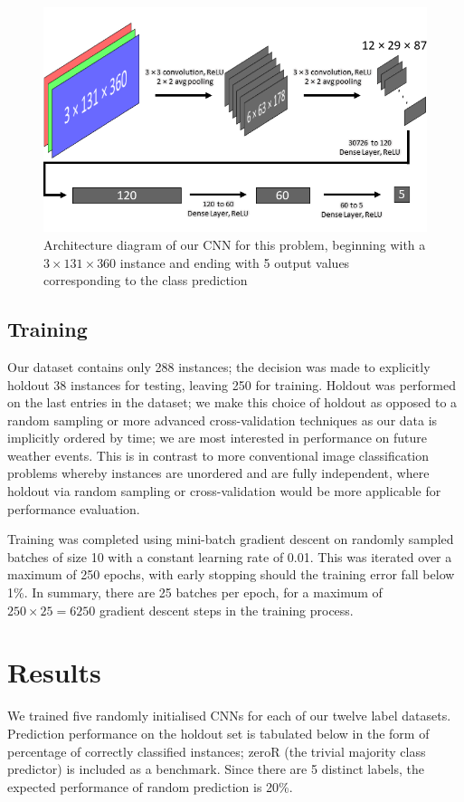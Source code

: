 \documentclass[11pt,a4paper, titlepage]{article}
\begin{document}
\begin{figure}[h]
	\begin{center}
	\includegraphics[width=1.0\textwidth]{images/cnnDiag.png}
	\caption{Architecture diagram of our CNN for this problem, beginning with a $3 \times 131 \times 360$ instance and ending with 5 output values corresponding to the class prediction}
	\end{center}
\end{figure}

\subsection{Training}
Our dataset contains only 288 instances; the decision was made to explicitly holdout 38 instances for testing, leaving 250 for training. Holdout was performed on the last entries in the dataset; we make this choice of holdout as opposed to a random sampling or more advanced cross-validation techniques as our data is implicitly ordered by time; we are most interested in performance on future weather events. This is in contrast to more conventional image classification problems whereby instances are unordered and are fully independent, where holdout via random sampling or cross-validation would be more applicable for performance evaluation.

\smallskip

Training was completed using mini-batch gradient descent on randomly sampled batches of size 10 with a constant learning rate of 0.01. This was iterated over a maximum of 250 epochs, with early stopping should the training error fall below 1\%. In summary, there are 25 batches per epoch, for a maximum of $250 \times 25 = 6250$ gradient descent steps in the training process.

\section{Results}
We trained five randomly initialised CNNs for each of our twelve label datasets. Prediction performance on the holdout set is tabulated below in the form of percentage of correctly classified instances; zeroR (the trivial majority class predictor) is included as a benchmark. Since there are 5 distinct labels, the expected performance of random prediction is 20\%.
\end{document}
